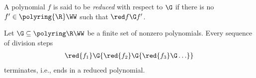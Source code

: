 A polynomial $f$ is said to be \emph{reduced} with respect to $\G$ if there is no 
$f' \in \polyring{\R}\WW$ such that $\red f \G f'$.
%
\begin{lemma}\label{lem:red terminates}
Let 
$\G \subseteq \polyring \R \WW$ be a finite set of nonzero polynomials. 
Every sequence of division steps
\begin{align} \label{eq:inf red}
\red {f_1} \G {\red {f_2} \G {\red {f_3} \G \ldots}}
\end{align}
terminates, i.e., ends in a reduced polynomial.
\end{lemma}
%
%
